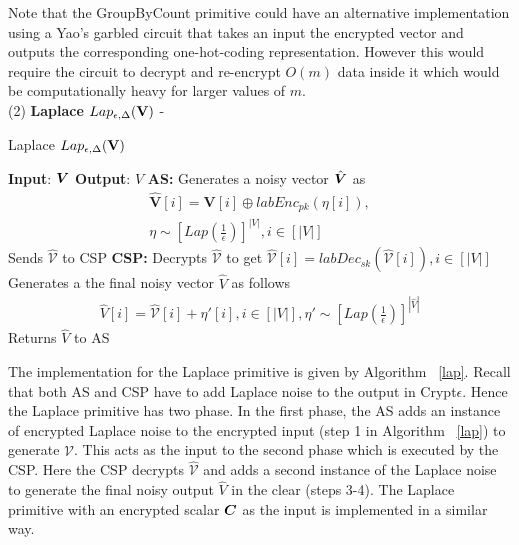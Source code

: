 Note that the \textsf{GroupByCount} primitive could have an alternative implementation using a Yao's garbled circuit that takes an input the encrypted vector and outputs the corresponding one-hot-coding representation. However this would require the circuit to decrypt and re-encrypt $O(m)$ data inside it which would be computationally heavy for larger values of $m$. 
 \\ (2)\textbf{ \textsf{Laplace }}$Lap_{\epsilon,\Delta}(\mathbf{V})$ -  
\begin{algorithm}
\small
\caption{\textsf{Laplace }$Lap_{\epsilon,\Delta}(\mathbf{V})$}
\begin{algorithmic}[1]
\STATEx
\textbf{Input}: $\boldsymbol{V}$
\STATEx \textbf{Output}: $\hat{V}$
\STATEx \textbf{\textsf{AS}:} \STATE Generates a noisy vector $\hat{\boldsymbol{V}}$  as \begin{gather*}\hat{\mathbf{V}}[i] = \mathbf{V}[i]\oplus labEnc_{pk}(\eta[i]),\\ \eta \sim [Lap(\frac{1}{\epsilon})]^{|V|}, i \in [|V|] \end{gather*}
\STATE Sends $\hat{\mathbb{\mathcal{V}}}$  to \textsf{CSP}
\STATEx \textbf{\textsf{CSP}:}
\STATE Decrypts $\mathbf{\hat{\mathcal{V}}}$ to get $\hat{\mathcal{V}}[i]=labDec_{sk}(\mathbf{\hat{\mathcal{V}}}[i]), i \in [|V|]$
\STATE Generates a the final noisy vector $\hat{V}$ as follows 
\begin{gather*} \hat{V}[i]=\hat{\mathcal{V}}[i]+\eta'[i], i \in [|V|], \eta' \sim [Lap(\frac{1}{\epsilon})]^{|\hat{V}|} \end{gather*}
\STATE Returns $\hat{V}$ to \textsf{AS}
 \end{algorithmic} \label{lap}
\end{algorithm} The implementation for the \textsf{Laplace} primitive is given by Algorithm ~\ref{lap}. Recall that both \textsf{AS} and \textsf{CSP} have to add Laplace noise to the output in Crypt$\epsilon$. Hence the \textsf{Laplace} primitive has two phase. In the first phase,  the \textsf{AS} adds an instance of encrypted Laplace noise to the encrypted input (step 1 in Algorithm ~\ref{lap}) to generate $\mathbf{\hat{\mathcal{V}}}$. This acts as the input to the second phase which is executed by the \textsf{CSP}. Here the \textsf{CSP} decrypts $\mathbf{\hat{\mathcal{V}}}$ and adds a second instance of the Laplace noise to generate the final noisy output $\hat{V}$ in the clear (steps 3-4). The \textsf{Laplace} primitive with an encrypted scalar $\boldsymbol{C}$ as the input is implemented in a similar way. 

